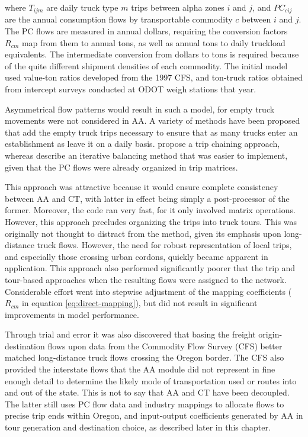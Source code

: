 \noindent where $T_{ijm}$ are daily truck type $m$ trips between alpha zones $i$ and $j$, and $PC_{cij}$ are the annual consumption flows by transportable commodity $c$ between $i$ and $j$. The PC flows are measured in annual dollars, requiring the conversion factors $R_{cm}$ map from them to annual tons, as well as annual tons to daily truckload equivalents. The intermediate conversion from dollars to tons is required because of the quite different shipment densities of each commodity. The initial model used value-ton ratios developed from the 1997 CFS, and ton-truck ratios obtained from intercept surveys conducted at ODOT weigh stations that year.

Asymmetrical flow patterns would result in such a model, for empty truck movements were not considered in AA. A variety of methods have been proposed that add the empty truck trips necessary to ensure that as many trucks enter an establishment as leave it on a daily basis. \cite{holguinveras03} propose a trip chaining approach, whereas \cite{moeckel16} describe an iterative balancing method that was easier to implement, given that the PC flows were already organized in trip matrices.

This approach was attractive because it would ensure complete consistency between AA and CT, with latter in effect being simply a post-processor of the former. Moreover, the code ran very fast, for it only involved matrix operations. However, this approach precludes organizing the trips into truck tours. This was originally not thought to distract from the method, given its emphasis upon long-distance truck flows. However, the need for robust representation of local trips, and especially those crossing urban cordons, quickly became apparent in application. This approach also performed significantly poorer that the trip and tour-based approaches when the resulting flows were assigned to the network. Considerable effort went into stepwise adjustment of the mapping coefficients ($R_{cm}$ in equation \ref{eq:direct-mapping}), but did not result in significant improvements in model performance.

Through trial and error it was also discovered that basing the freight origin-destination flows upon data from the Commodity Flow Survey (CFS) better matched long-distance truck flows crossing the Oregon border. The CFS also provided the interstate flows that the AA module did not represent in fine enough detail to determine the likely mode of transportation used or routes into and out of the state. This is not to say that AA and CT have been decoupled. The latter still uses PC flow data and industry mappings to allocate flows to precise trip ends within Oregon, and input-output coefficients generated by AA in tour generation and destination choice, as described later in this chapter.

